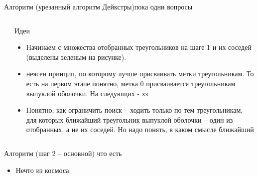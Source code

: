 \documentclass[10pt, xcolor={dvipsnames}]{beamer}
\begin{document}
\begin{frame}{Алгоритм (урезанный алгоритм Дейкстры)}{пока одни вопросы}
\begin{columns}
\begin{column}{0.3\textwidth}
\begin{center}
\end{center}
\end{column}
\begin{column}{0.7\textwidth}
\small{
Идеи
\begin{itemize}
\item Начинаем с множества отобранных треугольников на шаге 1 и их соседей (выделены зеленым на рисунке).
\item неясен принцип, по которому лучше присваивать метки треугольникам. То есть на первом этапе понятно, метка 0 присваивается треугольникам выпуклой оболочки. На следующих - хз
\item Понятно, как ограничить поиск -- ходить только по тем треугольникам, для которых ближайший треугольник выпуклой оболочки -- один из отобранных, а не их соседей.
 Но надо понять, в каком смысле ближайший
\end{itemize}
}
\end{column}
\end{columns}

\end{frame}

\begin{frame}{Алгоритм (шаг 2 -- основной) }{что есть}
\begin{itemize}
\item Нечто из космоса:
\end{itemize}
\begin{center}
\end{center}
\end{frame}
\end{document}

